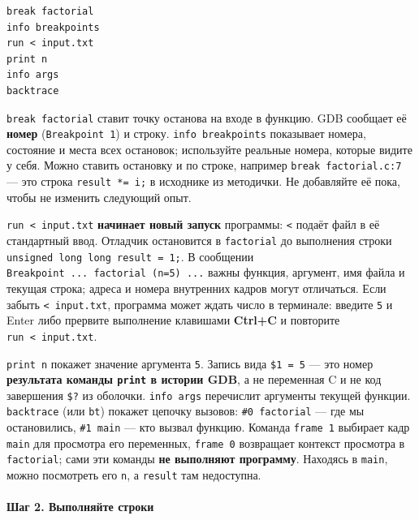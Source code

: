 \begin{verbatim}
break factorial
info breakpoints
run < input.txt
print n
info args
backtrace
\end{verbatim}

\texttt{break\ factorial} ставит точку останова на входе в функцию. GDB
сообщает её \textbf{номер} (\texttt{Breakpoint\ 1}) и строку.
\texttt{info\ breakpoints} показывает номера, состояние и места всех
остановок; используйте реальные номера, которые видите у себя. Можно
ставить остановку и по строке, например \texttt{break\ factorial.c:7}
--- это строка \texttt{result\ *=\ i;} в исходнике из методички. Не
добавляйте её пока, чтобы не изменить следующий опыт.

\texttt{run\ \textless{}\ input.txt} \textbf{начинает новый запуск}
программы: \texttt{\textless{}} подаёт файл в её стандартный ввод.
Отладчик остановится в \texttt{factorial} до выполнения строки
\texttt{unsigned\ long\ long\ result\ =\ 1;}. В сообщении
\texttt{Breakpoint\ ...\ factorial\ (n=5)\ ...} важны функция, аргумент,
имя файла и текущая строка; адреса и номера внутренних кадров могут
отличаться. Если забыть \texttt{\textless{}\ input.txt}, программа может
ждать число в терминале: введите \texttt{5} и Enter либо прервите
выполнение клавишами \textbf{Ctrl+C} и повторите
\texttt{run\ \textless{}\ input.txt}.

\texttt{print\ n} покажет значение аргумента \texttt{5}. Запись вида
\texttt{\$1\ =\ 5} --- это номер \textbf{результата команды
\texttt{print} в истории GDB}, а не переменная C и не код завершения
\texttt{\$?} из оболочки. \texttt{info\ args} перечислит аргументы
текущей функции. \texttt{backtrace} (или \texttt{bt}) покажет цепочку
вызовов: \texttt{\#0\ factorial} --- где мы остановились,
\texttt{\#1\ main} --- кто вызвал функцию. Команда \texttt{frame\ 1}
выбирает кадр \texttt{main} для просмотра его переменных,
\texttt{frame\ 0} возвращает контекст просмотра в \texttt{factorial};
сами эти команды \textbf{не выполняют программу}. Находясь в
\texttt{main}, можно посмотреть его \texttt{n}, а \texttt{result} там
недоступна.

\hypertarget{ux448ux430ux433-2-ux432ux44bux43fux43eux43bux43dux44fux439ux442ux435-ux441ux442ux440ux43eux43aux438}{%
\paragraph{Шаг 2. Выполняйте
строки}\label{ux448ux430ux433-2-ux432ux44bux43fux43eux43bux43dux44fux439ux442ux435-ux441ux442ux440ux43eux43aux438}}

